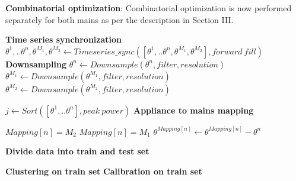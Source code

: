 \documentclass[conference]{IEEEtran}
\begin{document}
\noindent\textbf{Combinatorial optimization}: Combinatorial optimization is now performed separately for both mains as per the description in Section III. \vspace{-1mm}


\begin{algorithm}[ht!]
\DontPrintSemicolon %
\BlankLine
\textbf{Time series synchronization}\;
\BlankLine
\nl$\theta^1,..\theta^n,\theta^{M_1},\theta^{M_2} \gets Timeseries\_sync([\theta^1,..\theta^n,\theta^{M_1},\theta^{M_2}],forward\: fill)$\;
\BlankLine
\textbf{Downsampling}
\BlankLine
\nl {}
    {
    $\theta^n \gets Downsample(\theta^n,filter,resolution)$\;
    }
\nl $\theta^{M_1} \gets Downsample(\theta^{M_1},filter,resolution)$\;
\nl $\theta^{M_2} \gets Downsample(\theta^{M_2},filter,resolution)$\;


\nl $j \gets Sort([\theta^1,..\theta^n],peak\: power)$\;
\BlankLine
\textbf{Appliance to mains mapping}\;
\nl {}
    {
    
\nl {} 
        { $Mapping[n]=M_2$\;        
        }  
\nl {}
        { $Mapping[n]=M_1$\;
        }
\nl {}
    \nl $\theta^{Mapping[n]} \gets \theta^{Mapping[n]} - \theta^n $ \;
    }
    \BlankLine
    \textbf{Divide data into train and test set}\;
    \BlankLine
    
        
        \textbf{Clustering on train set}\;
    \nl {}
    \BlankLine
    \textbf{Calibration on train set} \;
\nl {}
\end{algorithm}
\end{document}

